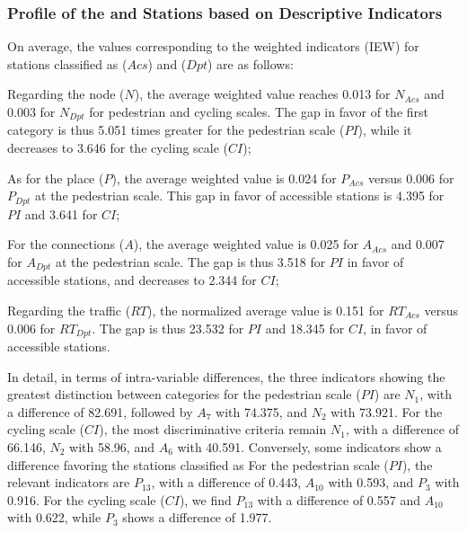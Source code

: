 \begin{refsegment}
\subsubsection*{Profile of the  and  Stations based on Descriptive Indicators
    \label{chap6:results-profil-gares-dependance}
    }

On average, the values corresponding to the weighted indicators (\acrshort{IEW}) for stations classified as  (\(Acs\)) and  (\(Dpt\)) are as follows:
\begin{customitemize}
    \item Regarding the node (\(N\)), the average weighted value reaches 0.013 for \(N_{Acs}\) and 0.003 for \(N_{Dpt}\) for pedestrian and cycling scales. The gap in favor of the first category is thus 5.051 times greater for the pedestrian scale (\(PI\)), while it decreases to 3.646 for the cycling scale (\(CI\));
    \item As for the place (\(P\)), the average weighted value is 0.024 for \(P_{Acs}\) versus 0.006 for \(P_{Dpt}\) at the pedestrian scale. This gap in favor of accessible stations is 4.395 for \(PI\) and 3.641 for \(CI\);
    \item For the connections (\(A\)), the average weighted value is 0.025 for \(A_{Acs}\) and 0.007 for \(A_{Dpt}\) at the pedestrian scale. The gap is thus 3.518 for \(PI\) in favor of accessible stations, and decreases to 2.344 for \(CI\);
    \item Regarding the traffic (\(RT\)), the normalized average value is 0.151 for \(RT_{Acs}\) versus 0.006 for \(RT_{Dpt}\). The gap is thus 23.532 for \(PI\) and 18.345 for \(CI\), in favor of accessible stations.
\end{customitemize}%

In detail, in terms of intra-variable differences, the three indicators showing the greatest distinction between categories for the pedestrian scale (\(PI\)) are \(N_{1}\), with a difference of 82.691, followed by \(A_{7}\) with 74.375, and \(N_{2}\) with 73.921. For the cycling scale (\(CI\)), the most discriminative criteria remain \(N_{1}\), with a difference of 66.146, \(N_{2}\) with 58.96, and \(A_{6}\) with 40.591. Conversely, some indicators show a difference favoring the stations classified as  For the pedestrian scale (\(PI\)), the relevant indicators are \(P_{13}\), with a difference of 0.443, \(A_{10}\) with 0.593, and \(P_{3}\) with 0.916. For the cycling scale (\(CI\)), we find \(P_{13}\) with a difference of 0.557 and \(A_{10}\) with 0.622, while \(P_{3}\) shows a difference of 1.977.%


\end{refsegment}

